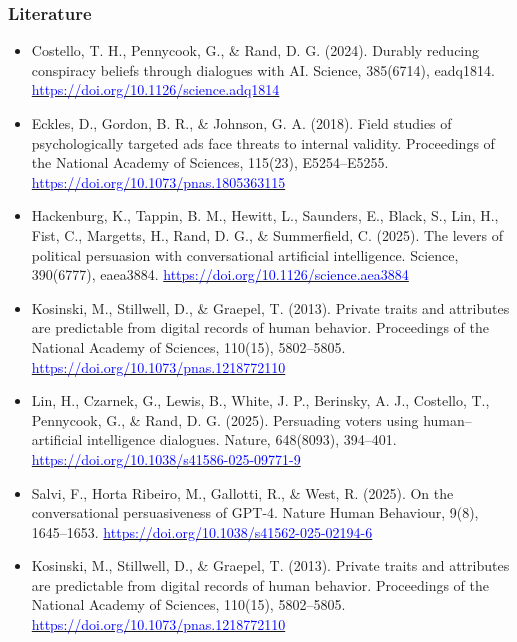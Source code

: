\documentclass[aspectratio=169]{beamer}
\begin{document}
\begin{frame}
    \frametitle{Literature}
    \tiny
    \begin{itemize}
        \item Costello, T. H., Pennycook, G., \& Rand, D. G. (2024). Durably reducing conspiracy beliefs through dialogues with AI. Science, 385(6714), eadq1814. \href{https://doi.org/10.1126/science.adq1814}{\textcolor{blue}{https://doi.org/10.1126/science.adq1814}}
        \item Eckles, D., Gordon, B. R., \& Johnson, G. A. (2018). Field studies of psychologically targeted ads face threats to internal validity. Proceedings of the National Academy of Sciences, 115(23), E5254–E5255. \href{https://doi.org/10.1073/pnas.1805363115}{\textcolor{blue}{https://doi.org/10.1073/pnas.1805363115}}
        \item Hackenburg, K., Tappin, B. M., Hewitt, L., Saunders, E., Black, S., Lin, H., Fist, C., Margetts, H., Rand, D. G., \& Summerfield, C. (2025). The levers of political persuasion with conversational artificial intelligence. Science, 390(6777), eaea3884. \href{https://doi.org/10.1126/science.aea3884}{\textcolor{blue}{https://doi.org/10.1126/science.aea3884}}
        \item Kosinski, M., Stillwell, D., \& Graepel, T. (2013). Private traits and attributes are predictable from digital records of human behavior. Proceedings of the National Academy of Sciences, 110(15), 5802–5805. \href{https://doi.org/10.1073/pnas.1218772110}{\textcolor{blue}{https://doi.org/10.1073/pnas.1218772110}}
        \item Lin, H., Czarnek, G., Lewis, B., White, J. P., Berinsky, A. J., Costello, T., Pennycook, G., \& Rand, D. G. (2025). Persuading voters using human–artificial intelligence dialogues. Nature, 648(8093), 394–401. \href{https://doi.org/10.1038/s41586-025-09771-9}{\textcolor{blue}{https://doi.org/10.1038/s41586-025-09771-9}}
        \item Salvi, F., Horta Ribeiro, M., Gallotti, R., \& West, R. (2025). On the conversational persuasiveness of GPT-4. Nature Human Behaviour, 9(8), 1645–1653. \href{https://doi.org/10.1038/s41562-025-02194-6}{\textcolor{blue}{https://doi.org/10.1038/s41562-025-02194-6}}
        \item Kosinski, M., Stillwell, D., \& Graepel, T. (2013). Private traits and attributes are predictable from digital records of human behavior. Proceedings of the National Academy of Sciences, 110(15), 5802–5805. \href{https://doi.org/10.1073/pnas.1218772110}{\textcolor{blue}{https://doi.org/10.1073/pnas.1218772110}}

\end{itemize}
\end{frame}
\end{document}
